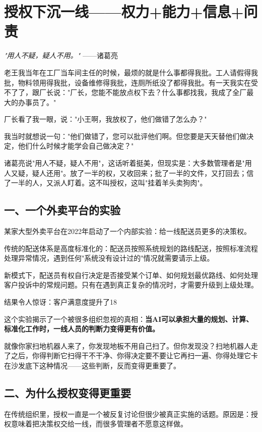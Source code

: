 \chapter{授权下沉一线——权力+能力+信息+问责}


\textit{"用人不疑，疑人不用。"}
——诸葛亮


老王我当年在工厂当车间主任的时候，最烦的就是什么事都得我批。工人请假得我批，物料领用得我批，设备维修得我批，连厕所纸没了都得我批。有一天我实在受不了了，跟厂长说："厂长，您能不能放点权下去？什么事都找我，我成了全厂最大的办事员了。"

厂长看了我一眼，说："小王啊，我放权了，他们做错了怎么办？"

我当时就想说一句："他们做错了，您可以批评他们啊。但您要是天天替他们做决定，他们什么时候才能学会自己做决定？"

诸葛亮说"用人不疑，疑人不用"，这话听着挺美，但现实是：大多数管理者是"用人又疑，疑人还用"。放了一半的权，又收回来；批了一半的文件，又打回去；信了一半的人，又派人盯着。这不叫授权，这叫"挂着羊头卖狗肉"。

\section{一、一个外卖平台的实验}


某家大型外卖平台在2022年启动了一个内部实验：给一线配送员更多的决策权。

传统的配送体系是高度标准化的：配送员按照系统规划的路线配送，按照标准流程处理异常情况，遇到任何"系统没有设计过的"情况就需要请示上级。

新模式下，配送员有权自行决定是否接受某个订单、如何规划最优路线、如何处理客户投诉中的常规问题。只有在遇到真正复杂的情况时，才需要升级到上级处理。

结果令人惊讶：客户满意度提升了18%

这个实验揭示了一个被很多组织忽视的真相：\textbf{当AI可以承担大量的规划、计算、标准化工作时，一线人员的判断力变得更有价值。}

就像你家扫地机器人来了，你发现地板不用自己扫了。但你发现没？扫地机器人走了之后，你得判断它扫得干不干净、你得决定要不要让它再扫一遍、你得处理它卡在沙发底下这种情况——这些判断，反而变得更重要了。

\section{二、为什么授权变得更重要}


在传统组织里，授权一直是一个被反复讨论但很少被真正实施的话题。原因是：授权意味着把决策权交给一线，而很多管理者不愿意这样做。

